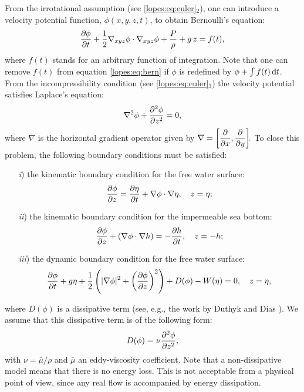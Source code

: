 From the irrotational assumption (see \eqref{lopes:eq:euler}\(_2\)), one can  introduce a
velocity potential function, \(\phi(x,y,z,t)\), to obtain  Bernoulli's equation:
\begin{equation}\label{lopes:eq:bern}
\frac{\partial  \phi}{\partial  t}+\frac{1}{2}\nabla_{xyz} \phi \cdot\nabla_{xyz} \phi
+\frac{P}{\rho} +g\, z=f(t), 
\end{equation}
where \(f(t)\) stands
for  an arbitrary function of integration.
 Note that one can   remove
 \(f(t)\)  from equation \eqref{lopes:eq:bern} if  \(\phi\) is
 redefined by \(\phi+\int f(t)\, {\rm d}t\).
From the incompressibility condition
(see \eqref{lopes:eq:euler}\(_3\))    
 the velocity potential  satisfies  Laplace's equation:
\begin{equation}\label{lopes:eq:laplace}
\nabla^2\phi+\frac{\partial ^2\phi}{\partial z^2}=0,
\end{equation}
where \(\nabla\) is the  horizontal gradient operator given
by \(\displaystyle \nabla=\left[\frac{\partial }{\partial x},\frac{\partial }{\partial y}\right]\!\!.\) 
To close this problem,  the following boundary conditions
must be satisfied:
\begin{enumerate}
\item[{\it i})]  the kinematic boundary condition for the free water surface: 
\begin{equation}
\frac{\partial \phi}{\partial z}=\frac{\partial \eta}{\partial t}+\nabla\phi\cdot\nabla\eta,\quad z=\eta;
\end{equation} 
\item[{\it ii})] the kinematic boundary condition for the impermeable sea bottom:
\begin{equation}
\frac{\partial \phi}{\partial z}+(\nabla\phi\cdot\nabla h)=-\frac{\partial h}{\partial t},
\quad z=-h ;
\end{equation}
\item[{\it iii})] the dynamic boundary condition for the free
water surface:
\begin{equation}\label{lopes:eq:dyn}
\frac{\partial \phi}{\partial t}+ g\eta+\frac{1}{2}
\left(|\nabla\phi|^2 +\left(\frac{\partial \phi}{\partial z}\right)^2\right)+
D(\phi)-W(\eta) = 0,
\quad z =\eta,
\end{equation}
\end{enumerate}
where \(D(\phi)\) is a  dissipative term (see, e.g., the work by Duthyk and 
Dias \cite{DutykhDias2007}).  
We assume that this dissipative term
 is of the following form:
\begin{equation}\label{lopes:eq:diss}
 D(\phi)=\nu\frac{\partial ^2\phi}{\partial z^2},
\end{equation}
with  \(\nu=\bar{\mu}/\rho\)  and \(\bar{\mu}\) an
 eddy-viscosity coefficient.
 Note that a
non-dissipative model means that there is no energy loss.
This is not acceptable from a physical point of view, since
any real flow is accompanied by energy dissipation.

